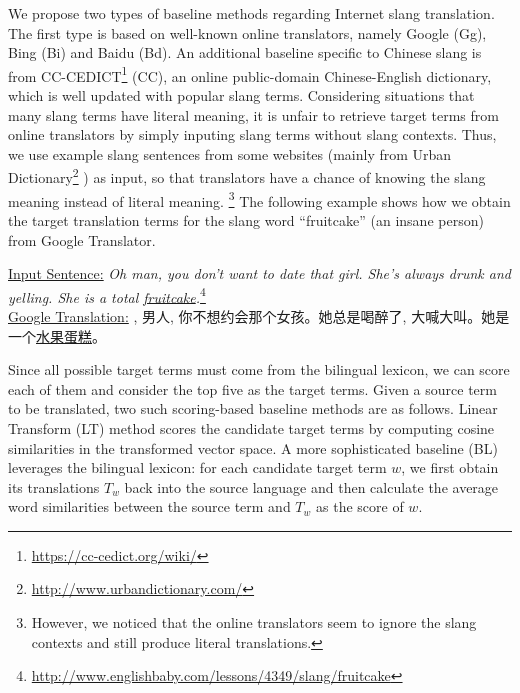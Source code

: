 We propose two types of baseline methods regarding Internet slang translation. 
The first type is based on well-known online translators, namely Google (Gg), 
Bing (Bi) and Baidu (Bd).
An additional baseline specific to Chinese slang is from CC-CEDICT\footnote{{\url{https://cc-cedict.org/wiki/}}} (CC), an online public-domain Chinese-English dictionary, which is well updated with popular slang terms. 
Considering situations that many slang terms have literal meaning, it is unfair to retrieve target terms from online translators by simply inputing slang terms without slang contexts. 
Thus, we use example slang sentences  from some websites 
(mainly from Urban Dictionary\footnote{{\url{http://www.urbandictionary.com/}}} ) 
as input, so that translators have a chance of knowing the slang meaning 
instead of literal meaning. \footnote{However, we noticed
that the online translators seem to ignore the slang contexts and still produce
literal translations.}
The following example shows how we obtain the target translation terms 
for the slang word ``fruitcake'' (an insane person) from Google Translator.

\noindent
\underline{Input Sentence:}
{\textit{Oh man, you don't want to date that girl. She's always drunk and yelling. She is a total \underline{fruitcake}.}}\footnote{{\url{http://www.englishbaby.com/lessons/4349/slang/fruitcake}}}\\ 
\underline{Google Translation:}
{, 男人, 你不想约会那个女孩。她总是喝醉了, 大喊大叫。她是一个\underline{水果蛋糕}。}

Since all possible target terms must come from the bilingual lexicon, 
we can score each of them and consider the top five as the target 
terms. Given a source term to be translated, two such scoring-based 
baseline methods are as follows.
Linear Transform (LT) method scores the candidate target terms by 
computing cosine similarities in the transformed vector space. 
A more sophisticated baseline (BL) leverages the bilingual lexicon: 
for each candidate target term $w$, we first obtain its translations 
$T_w$ back into the source language and then calculate the average word similarities between the source term and $T_w$  as the score of $w$. 


